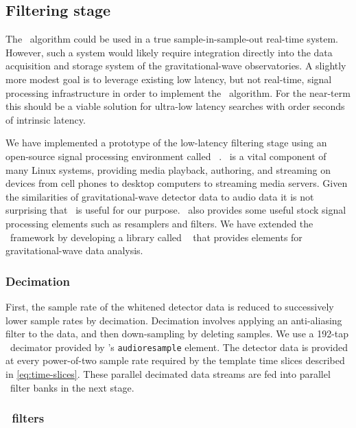 \subsection{Filtering stage}

The \lloid\ algorithm could be used in a true sample-in-sample-out real-time
system.  However, such a system would likely require integration directly into
the data acquisition and storage system of the gravitational-wave
observatories.  A slightly more modest goal is to leverage existing low
latency, but not real-time, signal processing infrastructure in order to
implement the \lloid\ algorithm.  For the near-term this should be a viable 
solution for ultra-low latency searches with order seconds of intrinsic latency.

We have implemented a prototype of the low-latency filtering stage using an
open-source signal processing environment called \gstreamer\ \cite{gstreamer}.
\gstreamer\ is a vital component of many Linux systems, providing media
playback, authoring, and streaming on devices from cell phones to desktop
computers to streaming media servers.  Given the similarities of
gravitational-wave detector data to audio data it is not surprising that
\gstreamer\ is useful for our purpose. \gstreamer\ also provides some useful
stock signal processing elements such as resamplers and filters.  We have
extended the \gstreamer\ framework by developing a library called
\gstlal{}~\cite{gstlal} that provides elements for gravitational-wave data
analysis.

\subsubsection{Decimation}

First, the sample rate of the whitened detector data is reduced to successively
lower sample rates by decimation.  Decimation involves applying an anti-aliasing
filter to the data, and then down-sampling by deleting samples.  We use a
192-tap \fir\ decimator provided by \gstreamer{}'s {\tt audioresample}
element.  The detector data is provided at every power-of-two sample rate
required by the template time slices described in \eqref{eq:time-slices}.  These
parallel decimated data streams are fed into parallel \fir\ filter banks in the
next stage.

\subsubsection{\fir\ filters}

